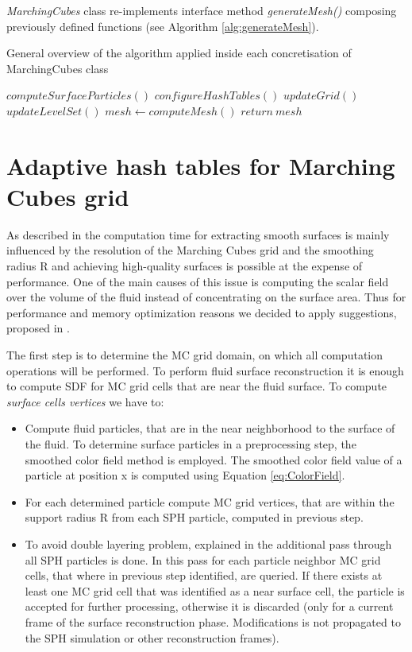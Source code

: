 \emph{MarchingCubes} class re-implements interface method \emph{generateMesh()} composing previously defined functions (see Algorithm \ref{alg:generateMesh}).

\begin{algorithm}
	\scriptsize
	\caption{General overview of the algorithm applied inside each concretisation of MarchingCubes class}
	\label{alg:generateMesh}
	\begin{algorithmic}
		\State $computeSurfaceParticles()$
		\State $configureHashTables()$
		\State $updateGrid()$
		\State $updateLevelSet()$
		\State $mesh \gets computeMesh()$ 
		\State $return\ mesh$
	\end{algorithmic}
\end{algorithm}

\section{Adaptive hash tables for Marching Cubes grid}
As described in \cite{Akinchi} the computation time for extracting smooth surfaces is mainly influenced by
the resolution of the Marching Cubes grid and the smoothing radius R and achieving high-quality surfaces is possible at the expense of performance. One of the main causes of this issue is computing the scalar field over the volume of the fluid instead of concentrating on the surface area. Thus for performance and memory optimization reasons we decided to apply suggestions, proposed in \cite{Akinchi}.

The first step is to determine the MC grid domain, on which all computation operations will be performed. To perform fluid surface reconstruction it is enough to compute SDF for MC grid cells that are near the fluid surface. To compute \emph{surface cells vertices} we have to:
\begin{itemize}
		\item Compute fluid particles, that are in the near neighborhood to the surface of the fluid. To determine surface particles in a preprocessing step, the smoothed color field method \cite{ColorField} is employed.  The smoothed color field value of a particle at position x is computed using Equation \ref{eq:ColorField}.
		\item For each determined particle compute MC grid vertices, that are within the support radius R from each SPH particle, computed in previous step.
		\item To avoid double layering problem, explained in the \cite{Akinchi} additional pass through all SPH particles is done. In this pass for each particle neighbor MC grid cells, that where in previous step identified, are queried. If there exists at least one MC grid cell that was identified as a near surface cell, the particle is accepted for further processing, otherwise it is discarded (only for a current frame of the surface reconstruction phase. Modifications is not propagated to the SPH simulation or other reconstruction frames).
\end{itemize}

